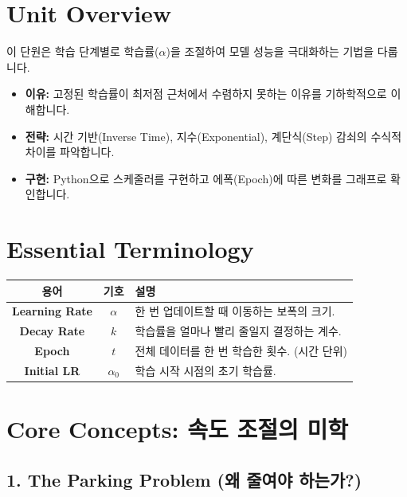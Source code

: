 \documentclass[11pt,a4paper]{book}
\theoremstyle{definition}
\begin{document}
\section{Unit Overview}
\begin{summarybox}[title={핵심 목표}]
이 단원은 학습 단계별로 학습률($\alpha$)을 조절하여 모델 성능을 극대화하는 기법을 다룹니다.
\begin{itemize}
    \item \textbf{이유:} 고정된 학습률이 최저점 근처에서 수렴하지 못하는 이유를 기하학적으로 이해합니다.
    \item \textbf{전략:} 시간 기반(Inverse Time), 지수(Exponential), 계단식(Step) 감쇠의 수식적 차이를 파악합니다.
    \item \textbf{구현:} Python으로 스케줄러를 구현하고 에폭(Epoch)에 따른 변화를 그래프로 확인합니다.
\end{itemize}
\end{summarybox}

\section{Essential Terminology}
\begin{center}
\begin{tabular}{|c|c|l|}
\hline
\textbf{용어} & \textbf{기호} & \textbf{설명} \\ \hline
\textbf{Learning Rate} & $\alpha$ & 한 번 업데이트할 때 이동하는 보폭의 크기. \\ \hline
\textbf{Decay Rate} & $k$ & 학습률을 얼마나 빨리 줄일지 결정하는 계수. \\ \hline
\textbf{Epoch} & $t$ & 전체 데이터를 한 번 학습한 횟수. (시간 단위) \\ \hline
\textbf{Initial LR} & $\alpha_0$ & 학습 시작 시점의 초기 학습률. \\ \hline
\end{tabular}
\end{center}

\section{Core Concepts: 속도 조절의 미학}

\subsection{1. The Parking Problem (왜 줄여야 하는가?)}
\end{document}

